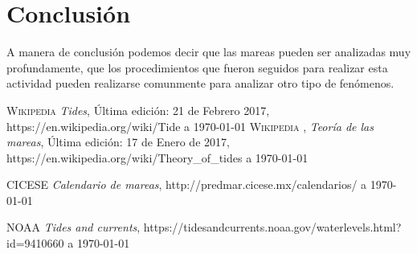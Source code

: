 \section{Conclusión}
\noindent A manera de conclusión podemos decir que las mareas pueden ser analizadas muy profundamente, que los procedimientos que fueron seguidos para realizar esta actividad pueden realizarse comunmente para analizar otro tipo de fenómenos.  
\newpage
\begin{thebibliography}{X}
 \textsc{Wikipedia}
\textit{Tides}, Última edición: 21 de Febrero 2017, https://en.wikipedia.org/wiki/Tide a \today
{} \textsc{Wikipedia}
,
\textit{Teoría de las mareas}, Última edición: 17 de Enero de 2017, https://en.wikipedia.org/wiki/Theory\_of\_tides a \today


 \textsc{CICESE}
\textit{Calendario de mareas}, http://predmar.cicese.mx/calendarios/ a \today

 \textsc{NOAA}
\textit{Tides and currents}, https://tidesandcurrents.noaa.gov/waterlevels.html?id=9410660 a \today
\end{thebibliography}


